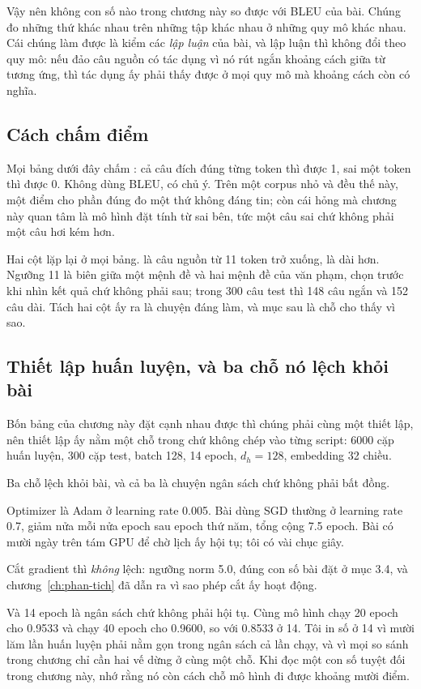Vậy nên không con số nào trong chương này so được với BLEU của bài. Chúng đo
những thứ khác nhau trên những tập khác nhau ở những quy mô khác nhau. Cái
chúng làm được là kiểm các \emph{lập luận} của bài, và lập luận thì không đổi
theo quy mô: nếu đảo câu nguồn có tác dụng vì nó rút ngắn khoảng cách giữa từ
tương ứng, thì tác dụng ấy phải thấy được ở mọi quy mô mà khoảng cách còn có
nghĩa.

\subsection*{Cách chấm điểm}

%
Mọi bảng dưới đây chấm : cả câu đích đúng
từng token thì được 1, sai một token thì được 0. Không dùng BLEU, có chủ ý. Trên
một corpus nhỏ và đều thế này, một điểm cho phần đúng đo một thứ không đáng tin;
còn cái hỏng mà chương này quan tâm là mô hình đặt tính từ sai bên, tức một câu
sai chứ không phải một câu hơi kém hơn.

Hai cột lặp lại ở mọi bảng.  là câu nguồn từ 11 token trở xuống,
 là dài hơn. Ngưỡng 11 là biên giữa một mệnh đề và hai mệnh đề của
văn phạm, chọn trước khi nhìn kết quả chứ không phải sau; trong 300 câu test thì
148 câu ngắn và 152 câu dài. Tách hai cột ấy ra là chuyện đáng làm, và mục sau
là chỗ cho thấy vì sao.

\subsection*{Thiết lập huấn luyện, và ba chỗ nó lệch khỏi bài}

%
Bốn bảng của chương này đặt cạnh nhau được thì chúng phải cùng một thiết lập,
nên thiết lập ấy nằm một chỗ trong  chứ không chép vào từng
script: 6000 cặp huấn luyện, 300 cặp test, batch 128, 14 epoch, \(d_h = 128\),
embedding 32 chiều.

Ba chỗ lệch khỏi bài, và cả ba là chuyện ngân sách chứ không phải bất đồng.

Optimizer là Adam ở learning rate 0.005. Bài dùng SGD thường ở learning rate
0.7, giảm nửa mỗi nửa epoch sau epoch thứ năm, tổng cộng 7.5 epoch. Bài có mười
ngày trên tám GPU để chờ lịch ấy hội tụ; tôi có vài chục giây.

Cắt gradient thì \emph{không} lệch: ngưỡng norm 5.0, đúng con số bài đặt ở mục
3.4, và chương~\ref{ch:phan-tich} đã dẫn ra vì sao phép cắt ấy hoạt động.

Và 14 epoch là ngân sách chứ không phải hội tụ. Cùng mô hình chạy 20 epoch cho
0.9533 và chạy 40 epoch cho 0.9600, so với 0.8533 ở 14. Tôi in số ở 14 vì mười
lăm lần huấn luyện phải nằm gọn trong ngân sách cả lần chạy, và vì mọi so sánh
trong chương chỉ cần hai vế dừng ở cùng một chỗ. Khi đọc một con số tuyệt đối
trong chương này, nhớ rằng nó còn cách chỗ mô hình đi được khoảng mười điểm.
